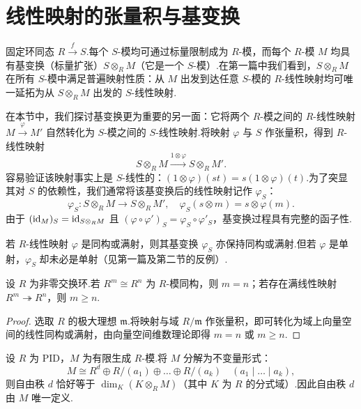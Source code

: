 \section{线性映射的张量积与基变换}
\label{sec:linear-base-ext}

固定环同态 $R \xrightarrow{f} S$.每个 $S$-模均可通过标量限制成为 $R$-模，而每个 $R$-模 $M$ 均具有基变换（标量扩张）$S \otimes_R M$（它是一个 $S$-模）.在第一篇中我们看到，$S \otimes_R M$ 在所有 $S$-模中满足普遍映射性质：从 $M$ 出发到达任意 $S$-模的 $R$-线性映射均可唯一延拓为从 $S \otimes_R M$ 出发的 $S$-线性映射.

在本节中，我们探讨基变换更为重要的另一面：它将两个 $R$-模之间的 $R$-线性映射 $M \xrightarrow{\varphi} M'$ 自然转化为 $S$-模之间的 $S$-线性映射.将映射 $\varphi$ 与 $S$ 作张量积，得到 $R$-线性映射
\[
  S \otimes_R M \xrightarrow{1 \otimes \varphi} S \otimes_R M'.
\]
容易验证该映射事实上是 $S$-线性的：$(1 \otimes \varphi)(st) = s(1 \otimes \varphi)(t)$.为了突显其对 $S$ 的依赖性，我们通常将该基变换后的线性映射记作 $\varphi_S$：
\begin{equation}
  \varphi_S \colon S \otimes_R M \to S \otimes_R M', \quad \varphi_S(s \otimes m) = s \otimes \varphi(m).
\end{equation}
由于 $(\operatorname{id}_M)_S = \operatorname{id}_{S \otimes_R M}$ 且 $(\varphi \circ \varphi')_S = \varphi_S \circ \varphi'_S$，基变换过程具有完整的函子性.

若 $R$-线性映射 $\varphi$ 是同构或满射，则其基变换 $\varphi_S$ 亦保持同构或满射.但若 $\varphi$ 是单射，$\varphi_S$ 却未必是单射（见第一篇及第二节的反例）.

\begin{theorem}\label{thm:invariance-rank-domain}
设 $R$ 为非零交换环.若 $R^m \cong R^n$ 为 $R$-模同构，则 $m = n$；若存在满线性映射 $R^m \twoheadrightarrow R^n$，则 $m \geq n$.
\end{theorem}

\begin{proof}
选取 $R$ 的极大理想 $\mathfrak{m}$.将映射与域 $R/\mathfrak{m}$ 作张量积，即可转化为域上向量空间的线性同构或满射，由向量空间维数理论即得 $m = n$ 或 $m \geq n$.
\end{proof}

\begin{theorem}\label{thm:pid-free-rank}
设 $R$ 为 PID，$M$ 为有限生成 $R$-模.将 $M$ 分解为不变量形式：
\[
  M \cong R^d \oplus R/(a_1) \oplus \dots \oplus R/(a_k) \quad (a_1 \mid \dots \mid a_k),
\]
则自由秩 $d$ 恰好等于 $\dim_K(K \otimes_R M)$（其中 $K$ 为 $R$ 的分式域）.因此自由秩 $d$ 由 $M$ 唯一定义.
\end{theorem}

